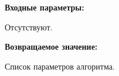 \textbf{Входные параметры:}

Отсутствуют.

\textbf{Возвращаемое значение:}

Список параметров алгоритма.